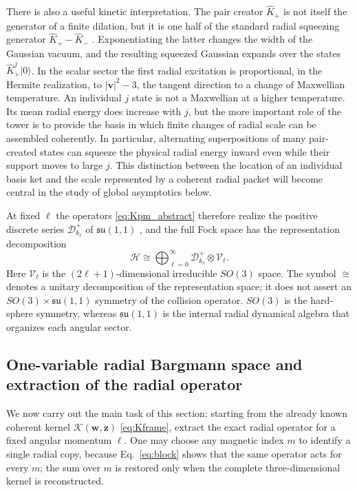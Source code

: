 \documentclass[11pt]{article}
\numberwithin{equation}{section}
\theoremstyle{definition}
\begin{document}
There is also a useful kinetic interpretation.  The pair creator
$\widehat K_+$ is not itself the generator of a finite dilation, but it is one
half of the standard radial squeezing generator
$\widehat K_+-\widehat K_-$ \cite{Perelomov1986}.  Exponentiating the latter changes the width of
the Gaussian vacuum, and the resulting squeezed Gaussian expands over the
states $\widehat K_+^j|0\rangle$.  In the scalar sector the first radial
excitation is proportional, in the Hermite realization, to
$|\bm v|^2-3$, the tangent direction to a change of Maxwellian temperature.
An individual $j$ state is not a Maxwellian at a higher temperature.  Its
mean radial energy does increase with $j$, but the more important role of the
tower is to provide the basis in which finite changes of radial scale can be
assembled coherently.  In particular, alternating superpositions of many
pair-created states can squeeze the physical radial energy inward even while
their support moves to large $j$.  This distinction between the location of an
individual basis ket and the scale represented by a coherent radial packet
will become central in the study of global asymptotics below.

At fixed $\ell$ the operators \eqref{eq:Kpm_abstract} therefore realize the
positive discrete series $\mathcal D^+_{k_\ell}$ of $\mathfrak{su}(1,1)$
\cite{Perelomov1986}, and the full Fock space has
the representation decomposition
\begin{equation}
 \mathscr H
 \cong
 \bigoplus_{\ell=0}^\infty
 \mathcal D^+_{k_\ell}\otimes\mathcal V_\ell.
 \label{eq:su11decomp}
\end{equation}
Here $\mathcal V_\ell$ is the $(2\ell+1)$-dimensional irreducible $SO(3)$
space.  The symbol $\cong$ denotes a unitary decomposition of the
representation space; it does not assert an $SO(3)\times \mathfrak{su}(1,1)$ symmetry of
the collision operator.  $SO(3)$ is the hard-sphere symmetry, whereas
$\mathfrak{su}(1,1)$ is the internal radial dynamical algebra that organizes each
angular sector.

\subsection{One-variable radial Bargmann space and extraction of the radial operator}

We now carry out the main task of this section: starting from the already
known coherent kernel $\mathcal K(\bm w,\bm z)$ \eqref{eq:Kframe}, extract the exact radial
operator for a fixed angular momentum $\ell$.  One may choose any magnetic
index $m$ to identify a single radial copy, because Eq.~\eqref{eq:block}
shows that the same operator acts for every $m$; the sum over $m$ is restored
only when the complete three-dimensional kernel is reconstructed.
\end{document}
